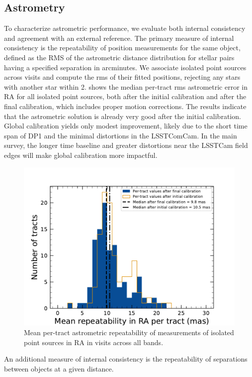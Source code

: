 \subsection{Astrometry}
To characterize astrometric performance, we evaluate both internal consistency and agreement with an external reference.
The primary measure of internal consistency is the repeatability of position measurements for the same object, defined as the RMS of the astrometric distance distribution for 
stellar pairs having a specified separation in arcminutes. 
We associate isolated point sources across visits and compute the rms of their fitted positions, rejecting any stars with another star within  2\arcsec.
 shows the median per-\gls{tract} rms astrometric error in RA  for all isolated point sources, both after the initial calibration and after the final calibration, which includes proper motion corrections.
The results indicate that the astrometric solution is already very good after the initial \gls{calibration}.
Global calibration yields only modest improvement, likely due to the short time span of \gls{DP1} and the minimal distortions in the LSSTComCam.
In the main survey, the longer time baseline and greater distortions near the \gls{LSSTCam} field edges will make global calibration more impactful.
\begin{figure}[htb!]
\includegraphics[width=\linewidth]{Astrometry_dmAstroErr}
\caption{Mean per-tract astrometric repeatability of measurements of isolated point sources in RA in visits across all bands.}
\label{fig:dmAstroErr}
\end{figure}
An additional measure of internal consistency is the repeatability of separations between objects at a given distance.
